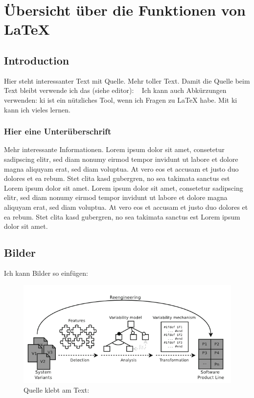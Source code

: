\chapter{Übersicht über die Funktionen von LaTeX}

\section{Introduction}
Hier steht interessanter Text mit Quelle. \cite{example_citation}  Mehr toller Text. Damit die Quelle beim Text bleibt verwende ich das (siehe editor): ~\cite{example_citation} 
Ich kann auch Abkürzungen verwenden: \ac{ki} ist ein nützliches Tool, wenn ich Fragen zu LaTeX habe. Mit \ac{ki} kann ich vieles lernen.

\subsection{Hier eine Unterüberschrift}
Mehr interessante Informationen. Lorem ipsum dolor sit amet, consetetur sadipscing elitr, sed diam nonumy eirmod tempor invidunt ut labore et dolore magna aliquyam erat, sed diam voluptua. At vero eos et accusam et justo duo dolores et ea rebum. Stet clita kasd gubergren, no sea takimata sanctus est Lorem ipsum dolor sit amet. Lorem ipsum dolor sit amet, consetetur sadipscing elitr, sed diam nonumy eirmod tempor invidunt ut labore et dolore magna aliquyam erat, sed diam voluptua. At vero eos et accusam et justo duo dolores et ea rebum. Stet clita kasd gubergren, no sea takimata sanctus est Lorem ipsum dolor sit amet. 

\section{Bilder}

Ich kann Bilder so einfügen:
\begin{figure}[h]
    \centering
    \includegraphics[width=0.5\linewidth]{figures/reengineering_phases.png}
    \caption{Quelle klebt am Text: ~\cite{assuncao_reengineering_2017}}
    \label{fig:Beipsielbild}
\end{figure}



